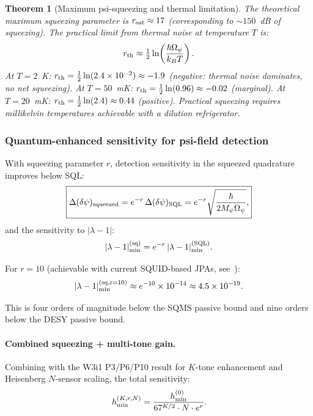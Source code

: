 \documentclass[11pt,twocolumn]{article}
\newcommand{\dpsi}{\delta\psi}
\newcommand{\lam}{\lambda}
\newcommand{\Opsi}{\Omega_\psi}
\newcommand{\Mpsi}{M_\psi}
\newcommand{\half}{\tfrac{1}{2}}
\newtheorem{theorem}{Theorem}
\begin{document}
\begin{theorem}[Maximum psi-squeezing and thermal limitation]
\label{thm:squeezing}
The theoretical maximum squeezing parameter is $r_{\rm sat} \approx 17$
(corresponding to $\sim 150$~dB of squeezing). The practical limit
from thermal noise at temperature $T$ is:
\begin{equation}
r_{\rm th} \approx \half\ln\!\left(\frac{\hbar\Opsi}{k_B T}\right).
\label{eq:r_th}
\end{equation}
At $T = 2$~K: $r_{\rm th} = \half\ln(2.4\times10^{-2}) \approx -1.9$
(negative: thermal noise dominates, no net squeezing).
At $T = 50$~mK: $r_{\rm th} = \half\ln(0.96) \approx -0.02$ (marginal).
At $T = 20$~mK: $r_{\rm th} = \half\ln(2.4) \approx 0.44$ (positive).
Practical squeezing requires millikelvin temperatures achievable
with a dilution refrigerator.
\end{theorem}

\subsubsection{Quantum-enhanced sensitivity for psi-field detection}

With squeezing parameter $r$, detection sensitivity in the squeezed
quadrature improves below SQL:
\begin{equation}
\boxed{
\Delta(\dpsi)_{\rm squeezed} = e^{-r}\,\Delta(\dpsi)_{\rm SQL}
= e^{-r}\sqrt{\frac{\hbar}{2\Mpsi\Opsi}},
}
\label{eq:squeezed_sensitivity}
\end{equation}
and the sensitivity to $|\lam-1|$:
\begin{equation}
|\lam-1|_{\rm min}^{\rm (sq)} = e^{-r}\,|\lam-1|_{\rm min}^{\rm (SQL)}.
\label{eq:lambda_squeezed}
\end{equation}

For $r = 10$ (achievable with current SQUID-based JPAs,
see~\cite{Kaufman2024}):
\begin{equation}
|\lam-1|_{\rm min}^{\rm (sq, r=10)}
\approx e^{-10}\times10^{-14} \approx 4.5\times10^{-19}.
\label{eq:lambda_sq_numeric}
\end{equation}

This is four orders of magnitude below the SQMS passive bound and
nine orders below the DESY passive bound.

\paragraph{Combined squeezing + multi-tone gain.}
Combining with the W3i1 P3/P6/P10 result for $K$-tone enhancement
and Heisenberg $N$-sensor scaling, the total sensitivity:
\begin{equation}
h_{\rm min}^{(K,r,N)} = \frac{h_{\rm min}^{(0)}}{67^{K/2}\cdot N \cdot e^r}.
\label{eq:total_sensitivity}
\end{equation}
\end{document}
